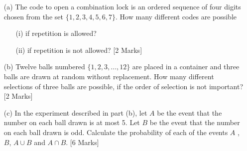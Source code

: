 \documentclass[12pt]{article}
\begin{document}
\begin{itemize}
\item[(a)] The code to open a combination lock is an ordered sequence of four digits
chosen from the set $\{1, 2, 3, 4, 5, 6, 7\}$. How many different codes are possible
\begin{itemize}
\item[(i)] if repetition is allowed?
\item[(ii)]  if repetition is not allowed? [2 Marks]
\end{itemize}
\item[(b)] Twelve balls numbered $\{1,2,3, \ldots ,12\}$ are placed in a container and three balls
are drawn at random without replacement. How many different selections of
three balls are possible, if the order of selection is not important? [2 Marks]
\item[(c)] In the experiment described in part (b), let $A$ be the event that the number on
each ball drawn is at most 5. Let $B$ be the event that the number on each ball
drawn is odd. Calculate the probability of each of the events $A$ , $B$, $A \cup B$ and $A \cap B$. [6 Marks]
\end{itemize}
\end{document}
